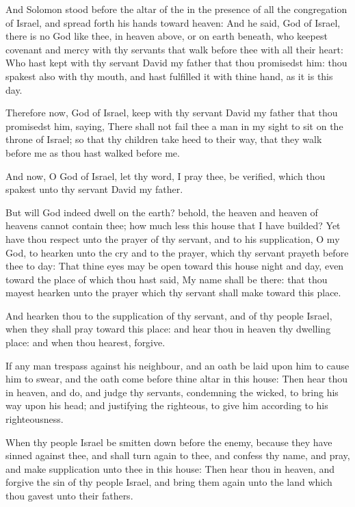 \verse And Solomon stood before the altar of the \LORD in the presence of all the congregation of Israel, and spread forth his hands toward heaven: \verse And he said, \LORD God of Israel, there is no God like thee, in heaven above, or on earth beneath, who keepest covenant and mercy with thy servants that walk before thee with all their heart: \verse Who hast kept with thy servant David my father that thou promisedst him: thou spakest also with thy mouth, and hast fulfilled it with thine hand, as it is this day.

\verse Therefore now, \LORD God of Israel, keep with thy servant David my father that thou promisedst him, saying, There shall not fail thee a man in my sight to sit on the throne of Israel; so that thy children take heed to their way, that they walk before me as thou hast walked before me.

\verse And now, O God of Israel, let thy word, I pray thee, be verified, which thou spakest unto thy servant David my father.

\verse But will God indeed dwell on the earth? behold, the heaven and heaven of heavens cannot contain thee; how much less this house that I have builded?  \verse Yet have thou respect unto the prayer of thy servant, and to his supplication, O \LORD my God, to hearken unto the cry and to the prayer, which thy servant prayeth before thee to day: \verse That thine eyes may be open toward this house night and day, even toward the place of which thou hast said, My name shall be there: that thou mayest hearken unto the prayer which thy servant shall make toward this place.

\verse And hearken thou to the supplication of thy servant, and of thy people Israel, when they shall pray toward this place: and hear thou in heaven thy dwelling place: and when thou hearest, forgive.

\verse If any man trespass against his neighbour, and an oath be laid upon him to cause him to swear, and the oath come before thine altar in this house: \verse Then hear thou in heaven, and do, and judge thy servants, condemning the wicked, to bring his way upon his head; and justifying the righteous, to give him according to his righteousness.

\verse When thy people Israel be smitten down before the enemy, because they have sinned against thee, and shall turn again to thee, and confess thy name, and pray, and make supplication unto thee in this house: \verse Then hear thou in heaven, and forgive the sin of thy people Israel, and bring them again unto the land which thou gavest unto their fathers.

